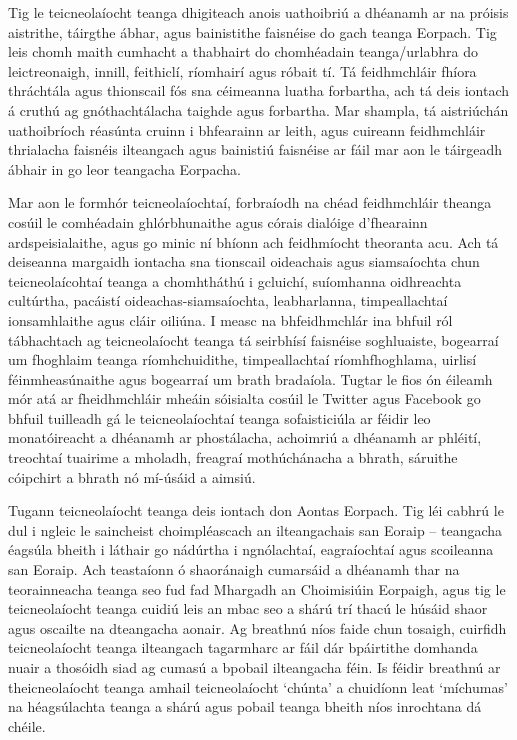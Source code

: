 \documentclass[]{../../metanetpaper}
\begin{document}
\begin{multicols}{2}
Tig le teicneolaíocht teanga dhigiteach anois uathoibriú a dhéanamh ar na próisis aistrithe, táirgthe ábhar, agus bainistithe faisnéise do gach teanga Eorpach. Tig leis chomh maith cumhacht a thabhairt do chomhéadain teanga/urlabhra do leictreonaigh, innill, feithiclí, ríomhairí agus róbait tí. Tá feidhmchláir fhíora thráchtála agus thionscail fós sna céimeanna luatha forbartha, ach tá deis iontach á cruthú ag gnóthachtálacha taighde agus forbartha. Mar shampla, tá aistriúchán uathoibríoch réasúnta cruinn i bhfearainn ar leith, agus cuireann feidhmchláir thrialacha faisnéis ilteangach agus bainistiú faisnéise ar fáil mar aon le táirgeadh ábhair in go leor teangacha Eorpacha. 

Mar aon le formhór teicneolaíochtaí, forbraíodh na chéad feidhmchláir theanga cosúil le comhéadain ghlórbhunaithe agus córais dialóige d’fhearainn ardspeisialaithe, agus go minic ní bhíonn ach feidhmíocht theoranta acu. Ach tá deiseanna margaidh iontacha sna tionscail oideachais agus siamsaíochta chun teicneolaícohtaí teanga a chomhtháthú i gcluichí, suíomhanna oidhreachta cultúrtha, pacáistí oideachas-siamsaíochta, leabharlanna, timpeallachtaí ionsamhlaithe agus cláir oiliúna. I measc na bhfeidhmchlár ina bhfuil ról tábhachtach ag teicneolaíocht teanga tá seirbhísí faisnéise soghluaiste, bogearraí um fhoghlaim teanga ríomhchuidithe, timpeallachtaí ríomhfhoghlama, uirlisí féinmheasúnaithe agus bogearraí um brath bradaíola. Tugtar le fios ón éileamh mór atá ar fheidhmchláir mheáin sóisialta cosúil le Twitter agus Facebook go bhfuil tuilleadh gá le teicneolaíochtaí teanga sofaisticiúla ar féidir leo monatóireacht a dhéanamh ar phostálacha, achoimriú a dhéanamh ar phléití, treochtaí tuairime a mholadh, freagraí mothúchánacha a bhrath, sáruithe cóipchirt a bhrath nó mí-úsáid a aimsiú.

Tugann teicneolaíocht teanga deis iontach don Aontas Eorpach. Tig léi cabhrú le dul i ngleic le saincheist choimpléascach an ilteangachais san Eoraip – teangacha éagsúla bheith i láthair go nádúrtha i ngnólachtaí, eagraíochtaí agus scoileanna san Eoraip. Ach teastaíonn ó shaoránaigh cumarsáid a dhéanamh thar na teorainneacha teanga seo fud fad Mhargadh an Choimisiúin Eorpaigh, agus tig le teicneolaíocht teanga cuidiú leis an mbac seo a shárú trí thacú le húsáid shaor agus oscailte na dteangacha aonair. Ag breathnú níos faide chun tosaigh, cuirfidh teicneolaíocht teanga ilteangach tagarmharc ar fáil dár bpáirtithe domhanda nuair a thosóidh siad ag cumasú a bpobail ilteangacha féin. Is féidir breathnú ar theicneolaíocht teanga amhail teicneolaíocht ‘chúnta’ a chuidíonn leat `míchumas’ na héagsúlachta teanga a shárú agus pobail teanga bheith níos inrochtana dá chéile.


\end{multicols}
\end{document}
